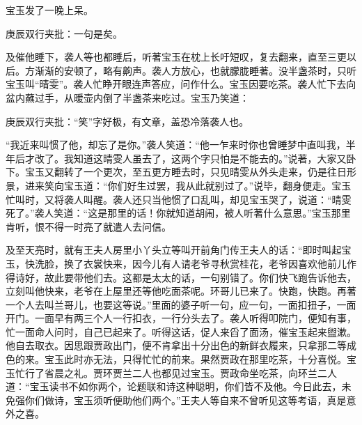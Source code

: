 \begin{parag}
    宝玉发了一晚上呆。\begin{note}庚辰双行夹批：一句是矣。\end{note}及催他睡下，袭人等也都睡后，听著宝玉在枕上长吁短叹，复去翻来，直至三更以后。方渐渐的安顿了，略有齁声。袭人方放心，也就朦胧睡著。没半盏茶时，只听宝玉叫“晴雯”。袭人忙睁开眼连声答应，问作什么。宝玉因要吃茶。袭人忙下去向盆内蘸过手，从暖壶内倒了半盏茶来吃过。宝玉乃笑道：\begin{note}庚辰双行夹批：“笑”字好极，有文章，盖恐冷落袭人也。\end{note}“我近来叫惯了他，却忘了是你。”袭人笑道：“他一乍来时你也曾睡梦中直叫我，半年后才改了。我知道这晴雯人虽去了，这两个字只怕是不能去的。”说著，大家又卧下。宝玉又翻转了一个更次，至五更方睡去时，只见晴雯从外头走来，仍是往日形景，进来笑向宝玉道：“你们好生过罢，我从此就别过了。”说毕，翻身便走。宝玉忙叫时，又将袭人叫醒。袭人还只当他惯了口乱叫，却见宝玉哭了，说道：“晴雯死了。”袭人笑道：“这是那里的话！你就知道胡闹，被人听著什么意思。”宝玉那里肯听，恨不得一时亮了就遣人去问信。
\end{parag}


\begin{parag}
    及至天亮时，就有王夫人房里小丫头立等叫开前角门传王夫人的话：“即时叫起宝玉，快洗脸，换了衣裳快来，因今儿有人请老爷寻秋赏桂花，老爷因喜欢他前儿作得诗好，故此要带他们去。这都是太太的话，一句别错了。你们快飞跑告诉他去，立刻叫他快来，老爷在上屋里还等他吃面茶呢。环哥儿已来了。快跑，快跑。再著一个人去叫兰哥儿，也要这等说。”里面的婆子听一句，应一句，一面扣扭子，一面开门。一面早有两三个人一行扣衣，一行分头去了。袭人听得叩院门，便知有事，忙一面命人问时，自己已起来了。听得这话，促人来舀了面汤，催宝玉起来盥漱。他自去取衣。因思跟贾政出门，便不肯拿出十分出色的新鲜衣履来，只拿那二等成色的来。宝玉此时亦无法，只得忙忙的前来。果然贾政在那里吃茶，十分喜悦。宝玉忙行了省晨之礼。贾环贾兰二人也都见过宝玉。贾政命坐吃茶，向环兰二人道：“宝玉读书不如你两个，论题联和诗这种聪明，你们皆不及他。今日此去，未免强你们做诗，宝玉须听便助他们两个。”王夫人等自来不曾听见这等考语，真是意外之喜。
\end{parag}


